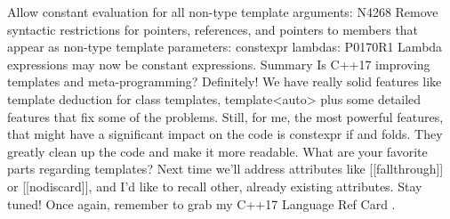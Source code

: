 Allow constant evaluation for all non-type template arguments: N4268
Remove syntactic restrictions for pointers, references, and pointers to members that appear as non-type template parameters:
constexpr lambdas: P0170R1
Lambda expressions may now be constant expressions. 
Summary
Is C++17 improving templates and meta-programming? Definitely!
We have really solid features like template deduction for class templates, template<auto> plus some detailed features that fix some of the problems. 
Still, for me, the most powerful features, that might have a significant impact on the code is constexpr if and folds. They greatly clean up the code and make it more readable.
What are your favorite parts regarding templates?
Next time we’ll address attributes like [[fallthrough]] or [[nodiscard]], and I’d like to recall other, already existing attributes. Stay tuned!
Once again, remember to grab my C++17 Language Ref Card .